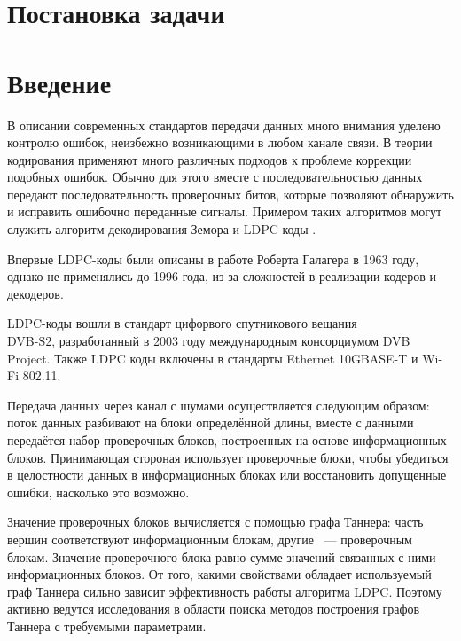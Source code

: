 \documentclass[14pt]{mmcs-article}
\begin{document}


\renewcommand{\contentsname}{Оглавление}

\tableofcontents

\newpage
{}

\section*{Постановка задачи}

\newpage
{}
\section*{Введение}

В описании современных стандартов передачи данных много внимания уделено контролю ошибок, неизбежно возникающими в любом канале связи. В теории кодирования применяют много различных подходов к проблеме коррекции подобных ошибок. Обычно для этого вместе с последовательностью данных передают последовательность проверочных битов, которые позволяют обнаружить и исправить ошибочно переданные сигналы. Примером таких алгоритмов могут служить алгоритм декодирования Земора \cite{zemor} и LDPC-коды \cite{johnson}.

Впервые LDPC-коды были описаны в работе Роберта Галагера \cite{gallager} в 1963 году, однако не применялись до 1996 года, из-за сложностей в реализации кодеров и декодеров.

LDPC-коды вошли в стандарт цифорвого спутникового вещания\\ DVB-S2, разработанный в 2003 году международным консорциумом DVB Project. Также LDPC коды включены в стандарты Ethernet 10GBASE-T и Wi-Fi 802.11.

Передача данных через канал с шумами осуществляется следующим образом: поток данных разбивают на блоки определённой длины, вместе с данными передаётся набор проверочных блоков, построенных на основе информационных блоков. Принимающая стороная использует проверочные блоки, чтобы убедиться в целостности данных в информационных блоках или  восстановить допущенные ошибки, насколько это возможно.

Значение проверочных блоков вычисляется с помощью графа Таннера: часть вершин соответствуют информационным блокам, другие ~--- проверочным блокам. Значение проверочного блока равно сумме значений связанных с ними информационных блоков. От того, какими свойствами обладает используемый граф Таннера сильно зависит эффективность работы алгоритма LDPC. Поэтому активно ведутся исследования в области поиска методов построения графов Таннера с требуемыми параметрами.
\end{document}
